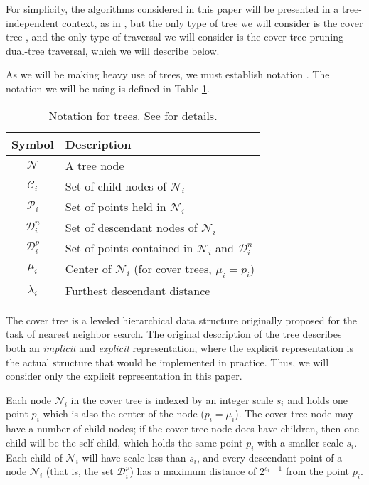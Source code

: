For simplicity, the algorithms considered in this paper will be presented in a
tree-independent context, as in \citet{curtin2013tree}, but the only type of
tree we will consider is the cover tree \citep{langford2006}, and the only type
of traversal we will consider is the cover tree pruning dual-tree traversal,
which we will describe below.

As we will be making heavy use of trees, we must establish notation \citep[taken
from][]{curtin2013tree}.  The notation we will be using is defined in Table
\ref{tab:notation}.

\begin{table}
{\small
\begin{center}
\begin{tabular}{|c|l|}
\hline
{\bf Symbol} & {\bf Description} \\ \hline
$\mathscr{N}$ & A tree node \\ \hline
$\mathscr{C}_i$ & Set of child nodes of $\mathscr{N}_i$ \\ \hline
$\mathscr{P}_i$ & Set of points held in $\mathscr{N}_i$ \\ \hline
$\mathscr{D}_i^n$ & Set of descendant nodes of $\mathscr{N}_i$ \\ \hline
$\mathscr{D}_i^p$ & Set of points contained in $\mathscr{N}_i$ and
$\mathscr{D}_i^n$ \\ \hline
$\mu_i$ & Center of $\mathscr{N}_i$ (for cover trees, $\mu_i = p_i$) \\ \hline
$\lambda_i$ & Furthest descendant distance \\ \hline
\end{tabular}
\end{center}
}
\caption{Notation for trees.  See \cite{curtin2013tree} for details.}
\label{tab:notation}
\end{table}

The cover tree is a leveled hierarchical data structure originally proposed for
the task of nearest neighbor search.  The original description of the tree
describes both an {\it implicit} and {\it explicit} representation, where the
explicit representation is the actual structure that would be implemented in
practice.  Thus, we will consider only the explicit representation in this
paper.

Each node $\mathscr{N}_i$ in the cover tree is indexed by an integer scale $s_i$
and holds one point $p_i$ which is also the center of the node ($p_i = \mu_i$).
The cover tree node may have a number of child nodes; if the cover tree node
does have children, then one child will be the self-child, which holds the same
point $p_i$ with a smaller scale $s_i$.  Each child of $\mathscr{N}_i$ will have
scale less than $s_i$, and every descendant point of a node $\mathscr{N}_i$
(that is, the set $\mathscr{D}_i^p$) has a maximum distance of $2^{s_i + 1}$
from the point $p_i$.

